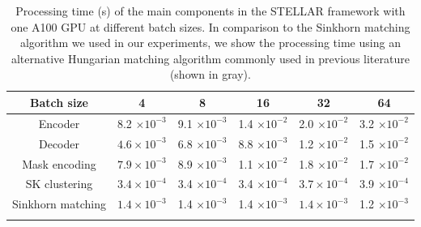 \begin{table}[ht]
\caption{Processing time (s) of the main components in the STELLAR framework with one A100 GPU at different batch sizes. In comparison to the Sinkhorn matching algorithm we used in our experiments, we show the processing time using an alternative Hungarian matching algorithm commonly used in previous literature (shown in gray).}
\label{finetune-table}
\begin{center}
\begin{tabular}{c|ccccc}
 Batch size & 4 & 8 & 16 & 32 & 64  \\
\hline 
Encoder & 8.2 $\times 10^{-3}$ & 9.1 $\times 10^{-3}$ & 1.4 $\times 10^{-2}$ & 2.0 $\times 10^{-2}$ & 3.2 $\times 10^{-2}$ \\
Decoder & $4.6 \times 10^{-3}$ & 6.8 $\times 10^{-3}$ & 8.8 $\times 10^{-3}$ & 1.2 $\times 10^{-2}$ & 1.5 $\times 10^{-2}$ \\
Mask encoding & $7.9 \times 10^{-3}$ & 8.9 $\times 10^{-3}$ & 1.1 $\times 10^{-2}$ & 1.8 $\times 10^{-2}$ & 1.7 $\times 10^{-2}$\\
SK clustering & $3.4 \times 10^{-4}$ & 3.4 $\times 10^{-4}$ & 3.4 $\times 10^{-4}$ & $3.7 \times 10^{-4}$ & 3.9 $\times 10^{-4}$  \\
Sinkhorn matching & $1.4 \times 10^{-3}$ & 1.4 $\times 10^{-3}$ & 1.4 $\times 10^{-3}$ & $1.4 \times 10^{-3}$ & 1.2 $\times 10^{-3}$ \\
\hline
\color{gray}{Hungarian matching} & \color{gray}{$5.7 \times 10^{-3}$} & \color{gray}{1.7 $\times 10^{-2}$} & \color{gray}{4.0 $\times 10^{-2}$} & \color{gray}{9.0 $\times 10^{-2}$} & \color{gray}{1.8 $\times 10^{-1}$}
\end{tabular}
\end{center}
\end{table}


